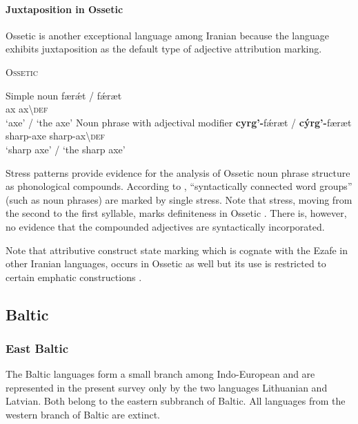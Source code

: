 \paragraph{Juxtaposition in Ossetic}
Ossetic is another exceptional language among Iranian because the language exhibits juxtaposition as the default type of adjective attribution marking.
\begin{exe}
\ex \textsc{Ossetic} \cite[12]{abaev1964} \label{ossetic attrcomp}
\begin{xlist}
\ex	Simple noun
\gll	færǽt / fǽræt\\
	ax { } ax\textbackslash\textsc{def}\\
\glt	‘axe’ / ‘the axe’
\ex	Noun phrase with adjectival modifier
\gll	\textbf{cyrg'-}fǽræt / \textbf{cýrg'-}færæt\\
	sharp-axe { } sharp-ax\textbackslash\textsc{def}\\
\glt	‘sharp axe’ / ‘the sharp axe’
\end{xlist}
\end{exe}
Stress patterns provide evidence for the analysis of Ossetic noun phrase structure as phonological compounds. According to \citet[10]{abaev1964}, “syntactically connected word groups” (such as noun phrases) are marked by single stress. Note that stress, moving from the second to the first syllable, marks definiteness in Ossetic \citep[12]{abaev1964}. There is, however, no evidence that the compounded adjectives are syntactically incorporated.

Note that attributive construct state marking which is cognate with the Ezafe in other Iranian languages, occurs in Ossetic as well but its use is restricted to certain emphatic constructions \cite[467]{thodarson1989}.

\subsection{Baltic} \label{baltic synchr}
\subsubsection{East Baltic}
The Baltic languages form a small branch among Indo-European and are represented in the present survey only by the two languages Lithuanian and Latvian. Both belong to the eastern subbranch of Baltic. All languages from the western branch of Baltic are extinct.\\

